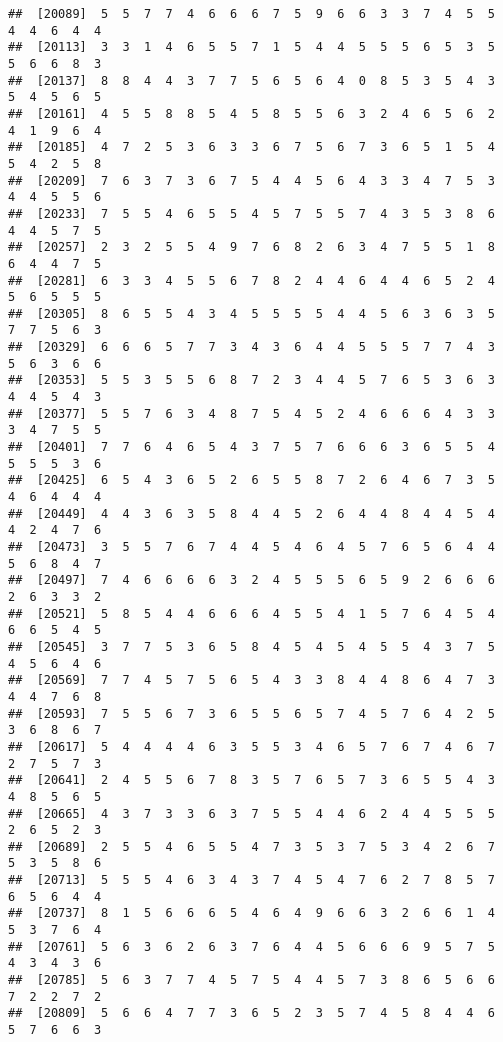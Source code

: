 \documentclass[
]{book}
\begin{document}
\begin{verbatim}
##  [20089]  5  5  7  7  4  6  6  6  7  5  9  6  6  3  3  7  4  5  5  4  4  6  4  4
##  [20113]  3  3  1  4  6  5  5  7  1  5  4  4  5  5  5  6  5  3  5  5  6  6  8  3
##  [20137]  8  8  4  4  3  7  7  5  6  5  6  4  0  8  5  3  5  4  3  5  4  5  6  5
##  [20161]  4  5  5  8  8  5  4  5  8  5  5  6  3  2  4  6  5  6  2  4  1  9  6  4
##  [20185]  4  7  2  5  3  6  3  3  6  7  5  6  7  3  6  5  1  5  4  5  4  2  5  8
##  [20209]  7  6  3  7  3  6  7  5  4  4  5  6  4  3  3  4  7  5  3  4  4  5  5  6
##  [20233]  7  5  5  4  6  5  5  4  5  7  5  5  7  4  3  5  3  8  6  4  4  5  7  5
##  [20257]  2  3  2  5  5  4  9  7  6  8  2  6  3  4  7  5  5  1  8  6  4  4  7  5
##  [20281]  6  3  3  4  5  5  6  7  8  2  4  4  6  4  4  6  5  2  4  5  6  5  5  5
##  [20305]  8  6  5  5  4  3  4  5  5  5  5  4  4  5  6  3  6  3  5  7  7  5  6  3
##  [20329]  6  6  6  5  7  7  3  4  3  6  4  4  5  5  5  7  7  4  3  5  6  3  6  6
##  [20353]  5  5  3  5  5  6  8  7  2  3  4  4  5  7  6  5  3  6  3  4  4  5  4  3
##  [20377]  5  5  7  6  3  4  8  7  5  4  5  2  4  6  6  6  4  3  3  3  4  7  5  5
##  [20401]  7  7  6  4  6  5  4  3  7  5  7  6  6  6  3  6  5  5  4  5  5  5  3  6
##  [20425]  6  5  4  3  6  5  2  6  5  5  8  7  2  6  4  6  7  3  5  4  6  4  4  4
##  [20449]  4  4  3  6  3  5  8  4  4  5  2  6  4  4  8  4  4  5  4  4  2  4  7  6
##  [20473]  3  5  5  7  6  7  4  4  5  4  6  4  5  7  6  5  6  4  4  5  6  8  4  7
##  [20497]  7  4  6  6  6  6  3  2  4  5  5  5  6  5  9  2  6  6  6  2  6  3  3  2
##  [20521]  5  8  5  4  4  6  6  6  4  5  5  4  1  5  7  6  4  5  4  6  6  5  4  5
##  [20545]  3  7  7  5  3  6  5  8  4  5  4  5  4  5  5  4  3  7  5  4  5  6  4  6
##  [20569]  7  7  4  5  7  5  6  5  4  3  3  8  4  4  8  6  4  7  3  4  4  7  6  8
##  [20593]  7  5  5  6  7  3  6  5  5  6  5  7  4  5  7  6  4  2  5  3  6  8  6  7
##  [20617]  5  4  4  4  4  6  3  5  5  3  4  6  5  7  6  7  4  6  7  2  7  5  7  3
##  [20641]  2  4  5  5  6  7  8  3  5  7  6  5  7  3  6  5  5  4  3  4  8  5  6  5
##  [20665]  4  3  7  3  3  6  3  7  5  5  4  4  6  2  4  4  5  5  5  2  6  5  2  3
##  [20689]  2  5  5  4  6  5  5  4  7  3  5  3  7  5  3  4  2  6  7  5  3  5  8  6
##  [20713]  5  5  5  4  6  3  4  3  7  4  5  4  7  6  2  7  8  5  7  6  5  6  4  4
##  [20737]  8  1  5  6  6  6  5  4  6  4  9  6  6  3  2  6  6  1  4  5  3  7  6  4
##  [20761]  5  6  3  6  2  6  3  7  6  4  4  5  6  6  6  9  5  7  5  4  3  4  3  6
##  [20785]  5  6  3  7  7  4  5  7  5  4  4  5  7  3  8  6  5  6  6  7  2  2  7  2
##  [20809]  5  6  6  4  7  7  3  6  5  2  3  5  7  4  5  8  4  4  6  5  7  6  6  3

\end{verbatim}
\end{document}
